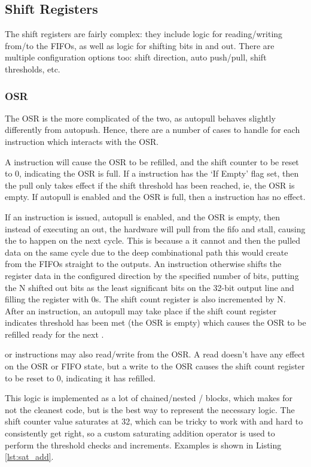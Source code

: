\subsection{Shift Registers}

The shift registers are fairly complex: they include logic for reading/writing from/to the FIFOs, as well as logic for shifting bits in and out. There are multiple configuration options too: shift direction, auto push/pull, shift thresholds, etc.


\subsubsection{OSR}

The OSR is the more complicated of the two, as autopull behaves slightly differently from autopush. Hence, there are a number of cases to handle for each instruction which interacts with the OSR.

A  instruction will cause the OSR to be refilled, and the shift counter to be reset to 0, indicating the OSR is full. If a  instruction has the `If Empty' flag set, then the pull only takes effect if the shift threshold has been reached, ie, the OSR is empty. If autopull is enabled and the OSR is full, then a  instruction has no effect.

If an  instruction is issued, autopull is enabled, and the OSR is empty, then instead of executing an out, the hardware will pull from the fifo and stall, causing the  to happen on the next cycle. This is because a it cannot  and then  the pulled data on the same cycle due to the deep combinational path this would create from the FIFOs straight to the outputs. An  instruction otherwise shifts the register data in the configured direction by the specified number of bits, putting the N shifted out bits as the least significant bits on the 32-bit output line and filling the register with 0s. The shift count register is also incremented by N. After an  instruction, an autopull may take place if the shift count register indicates threshold has been met (the OSR is empty) which causes the OSR to be refilled ready for the next .

 or  instructions may also read/write from the OSR. A read doesn't have any effect on the OSR or FIFO state, but a write to the OSR causes the shift count register to be reset to 0, indicating it has refilled.

This logic is implemented as a lot of chained/nested / blocks, which makes for not the cleanest code, but is the best way to represent the necessary logic. The shift counter value saturates at 32, which can be tricky to work with and hard to consistently get right, so a custom saturating addition operator \txt{+!} is used to perform the threshold checks and increments. Examples is shown in Listing \ref{lst:sat_add}.


